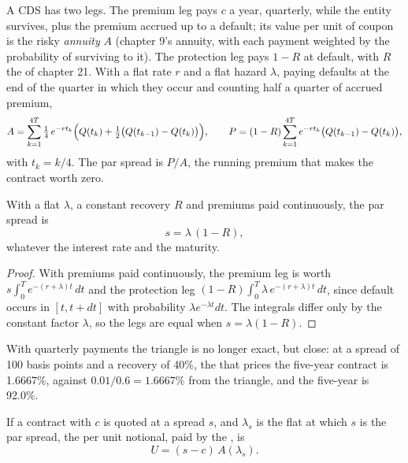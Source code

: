 A CDS has two legs. The premium leg pays $c$ a year, quarterly, while the entity
survives, plus the premium accrued up to a default; its value per unit of coupon is
the risky \emph{annuity} $A$ (chapter 9's annuity, with each payment weighted by the
probability of surviving to it). The protection leg pays $1 - R$ at default, with $R$
the  of chapter 21. With a flat rate $r$ and a flat hazard $\lambda$,
paying defaults at the end of the quarter in which they occur and counting half a
quarter of accrued premium,
\[
A = \sum_{k=1}^{4T} \tfrac14\, e^{-r t_k}\Bigl(Q(t_k) + \tfrac12\bigl(Q(t_{k-1}) - Q(t_k)\bigr)\Bigr),
\qquad
P = (1-R)\sum_{k=1}^{4T} e^{-r t_k}\bigl(Q(t_{k-1}) - Q(t_k)\bigr),
\]
with $t_k = k/4$. The par spread is $P/A$, the running premium that makes the contract
worth zero.

\begin{proposition}\label{prop:m2:credit-default-swaps:triangle}
With a flat  $\lambda$, a constant recovery $R$ and premiums paid
continuously, the par spread is
\[
s = \lambda\,(1 - R),
\]
whatever the interest rate and the maturity.
\end{proposition}

\begin{proof}
With premiums paid continuously, the premium leg is worth $s\int_0^T e^{-(r+\lambda)t}\,dt$
and the protection leg $(1-R)\int_0^T \lambda\,e^{-(r+\lambda)t}\,dt$, since default
occurs in $[t, t+dt]$ with probability $\lambda e^{-\lambda t}dt$. The integrals
differ only by the constant factor $\lambda$, so the legs are equal when $s =
\lambda(1-R)$.
\end{proof}

With quarterly payments the triangle is no longer exact, but close: at a spread of
100 basis points and a recovery of 40\%, the  that prices the five-year
contract is 1.6667\%, against $0.01/0.6 = 1.6667\%$ from the triangle, and the
five-year  is 92.0\%.

\begin{proposition}\label{prop:m2:credit-default-swaps:upfront}
If a contract with  $c$ is quoted at a spread $s$, and $\lambda_s$ is
the flat  at which $s$ is the par spread, the  per unit
notional, paid by the , is
\[
U = (s - c)\,A(\lambda_s).
\]
\end{proposition}

